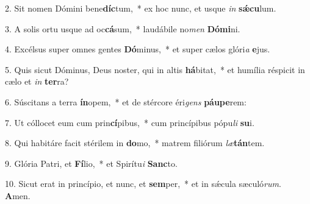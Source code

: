2. Sit nomen Dómini bene\textbf{díc}tum,~*  ex hoc nunc, et usque \textit{in} \textbf{sǽ}\textbf{cu}lum.\

3. A solis ortu usque ad oc\textbf{cá}sum,~*  laudábile no\textit{men} \textbf{Dó}\textbf{mi}ni.\

4. Excélsus super omnes gentes \textbf{Dó}minus,~*  et super cælos glóri\textit{a} \textbf{e}jus.\

5. Quis sicut Dóminus, Deus noster, qui in altis \textbf{há}bitat,~*  et humília réspicit in cælo et \textit{in} \textbf{ter}ra?\

6. Súscitans a terra \textbf{ín}opem,~*  et de stércore éri\textit{gens} \textbf{páu}\textbf{pe}rem:\

7. Ut cóllocet eum cum prin\textbf{cí}pibus,~*  cum princípibus pópu\textit{li} \textbf{su}i.\

8. Qui habitáre facit stérilem in \textbf{do}mo,~*  matrem filiórum \textit{læ}\textbf{tán}tem.\

9. Glória Patri, et \textbf{Fí}lio,~*  et Spirítu\textit{i} \textbf{Sanc}to.\

10. Sicut erat in princípio, et nunc, et \textbf{sem}per,~*  et in sǽcula sæculó\textit{rum}. \textbf{A}men.\

